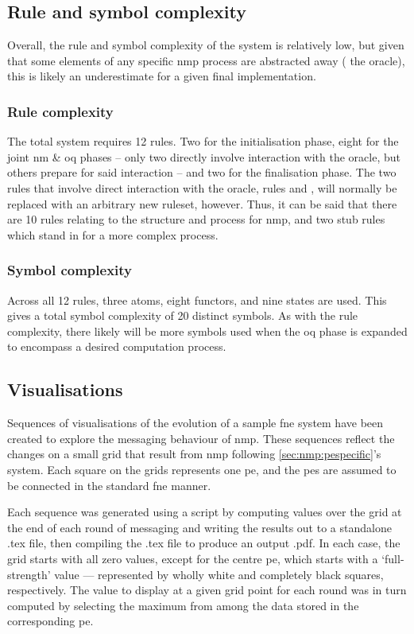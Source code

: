 \subsection{Rule and symbol complexity}
Overall, the rule and symbol complexity of the system is relatively low, but given that some elements of any specific \gls{nmp} process are abstracted away (\eg{} the oracle), this is likely an underestimate for a given final implementation.

\subsubsection{Rule complexity}
The total system requires 12 rules.  Two for the initialisation phase, eight for the joint \gls{nm} \& \gls{oq} phases -- only two directly involve interaction with the oracle, but others prepare for said interaction -- and two for the finalisation phase.  The two rules that involve direct interaction with the oracle, rules  and , will normally be replaced with an arbitrary new \gls{ruleset}, however.  Thus, it can be said that there are 10 rules relating to the structure and process for \gls{nmp}, and two stub rules which stand in for a more complex process.

\subsubsection{Symbol complexity}
Across all 12 rules, three atoms, eight functors, and nine states are used.  This gives a total symbol complexity of 20 distinct symbols.  As with the rule complexity, there likely will be more symbols used when the \gls{oq} phase is expanded to encompass a desired computation process.

\subsection{Visualisations}
Sequences of visualisations of the evolution of a sample \gls{fne} system have been created to explore the messaging behaviour of \gls{nmp}.  These sequences reflect the changes on a small grid that result from \gls{nmp} following \cref{sec:nmp:pespecific}'s system.  Each square on the grids represents one \gls{pe}, and the \glspl{pe} are assumed to be connected in the standard \gls{fne} manner.

Each sequence was generated using a script by computing values over the grid at the end of each round of messaging and writing the results out to a standalone .tex file, then compiling the .tex file to produce an output .pdf.  In each case, the grid starts with all zero values, except for the centre \gls{pe}, which starts with a `full-strength' value --- represented by wholly white and completely black squares, respectively.  The value to display at a given grid point for each round was in turn computed by selecting the maximum from among the data stored in the corresponding \gls{pe}.

